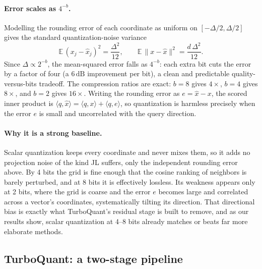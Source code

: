 \documentclass[11pt]{article}
\begin{document}
\paragraph{Error scales as $4^{-b}$.} Modelling the rounding error of each coordinate as uniform on $[-\Delta/2, \Delta/2]$ gives the standard quantization-noise variance~\cite{grayneuhoff1998}
\begin{equation}
\mathbb{E}\,(x_j - \hat{x}_j)^2 = \frac{\Delta^2}{12}, \qquad \mathbb{E}\,\|x - \hat{x}\|^2 = \frac{d\,\Delta^2}{12}.
\end{equation}
Since $\Delta \propto 2^{-b}$, the mean-squared error falls as $4^{-b}$: each extra bit cuts the error by a factor of four (a $6\,\mathrm{dB}$ improvement per bit), a clean and predictable quality-versus-bits tradeoff. The compression ratios are exact: $b = 8$ gives $4\times$, $b = 4$ gives $8\times$, and $b = 2$ gives $16\times$. Writing the rounding error as $e = \hat{x} - x$, the scored inner product is $\langle q, \hat{x}\rangle = \langle q, x\rangle + \langle q, e\rangle$, so quantization is harmless precisely when the error $e$ is small and uncorrelated with the query direction.

\paragraph{Why it is a strong baseline.} Scalar quantization keeps every coordinate and never mixes them, so it adds no projection noise of the kind JL suffers, only the independent rounding error above. By 4 bits the grid is fine enough that the cosine ranking of neighbors is barely perturbed, and at 8 bits it is effectively lossless. Its weakness appears only at 2 bits, where the grid is coarse and the error $e$ becomes large and correlated across a vector's coordinates, systematically tilting its direction. That directional bias is exactly what TurboQuant's residual stage is built to remove, and as our results show, scalar quantization at 4--8 bits already matches or beats far more elaborate methods.

\subsection{TurboQuant: a two-stage pipeline}
\end{document}
